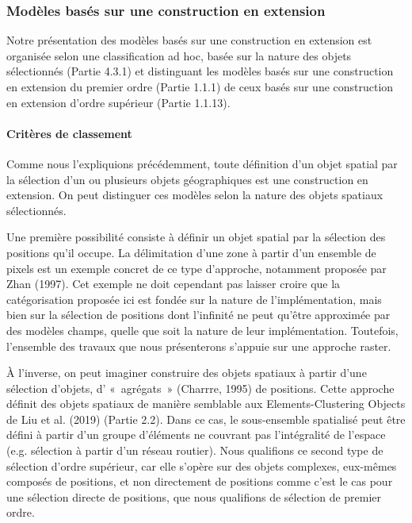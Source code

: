 \subsubsection{Modèles basés sur une construction en extension}

Notre présentation des modèles basés sur une construction en extension
est organisée selon une classification ad hoc, basée sur la nature des
objets sélectionnés (Partie 4.3.1) et distinguant les modèles basés
sur une construction en extension du premier ordre (Partie 1.1.1) de
ceux basés sur une construction en extension d’ordre supérieur (Partie
1.1.13).

\paragraph{Critères de classement}

Comme nous l’expliquions précédemment, toute définition d’un objet
spatial par la sélection d’un ou plusieurs objets géographiques est
une construction en extension. On peut distinguer ces modèles selon la
nature des objets spatiaux sélectionnés.

Une première possibilité consiste à définir un objet spatial par la
sélection des positions qu’il occupe. La délimitation d’une zone à
partir d’un ensemble de pixels est un exemple concret de ce type
d’approche, notamment proposée par Zhan (1997). Cet exemple ne doit
cependant pas laisser croire que la catégorisation proposée ici est
fondée sur la nature de l’implémentation, mais bien sur la sélection
de positions dont l’infinité ne peut qu’être approximée par des
modèles champs, quelle que soit la nature de leur
implémentation. Toutefois, l’ensemble des travaux que nous
présenterons s’appuie sur une approche raster.

À l’inverse, on peut imaginer construire des objets spatiaux à partir
d’une sélection d’objets, d’ « agrégats » (Charrre, 1995) de
positions. Cette approche définit des objets spatiaux de manière
semblable aux Elements-Clustering Objects de Liu et al. (2019) (Partie
2.2). Dans ce cas, le sous-ensemble spatialisé peut être défini à
partir d’un groupe d’éléments ne couvrant pas l’intégralité de
l’espace (e.g. sélection à partir d’un réseau routier). Nous
qualifions ce second type de sélection d’ordre supérieur, car elle
s’opère sur des objets complexes, eux-mêmes composés de positions, et
non directement de positions comme c’est le cas pour une sélection
directe de positions, que nous qualifions de sélection de premier
ordre.

